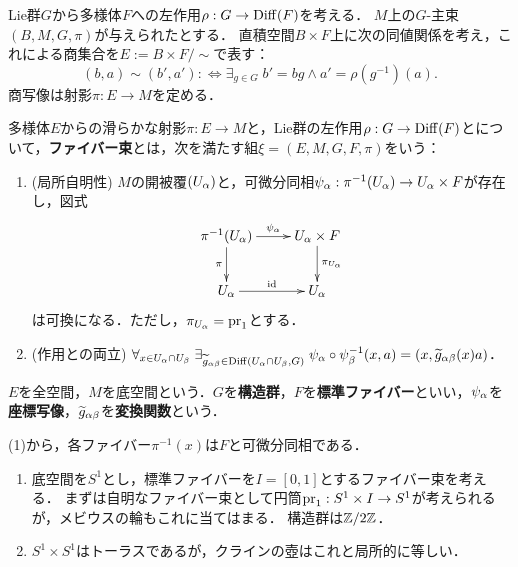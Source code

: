 \documentclass[uplatex,dvipdfmx]{jsreport}
\begin{document}
\begin{discussion}
    Lie群$G$から多様体$F$への左作用$\rho:G\to\mathrm{Diff}(F)$を考える．
    $M$上の$G$-主束$(B,M,G,\pi)$が与えられたとする．
    直積空間$B\times F$上に次の同値関係を考え，これによる商集合を$E:=B\times F/\sim$で表す：
    \[(b,a)\sim(b',a'):\Leftrightarrow\exists_{g\in G}\;b'=bg\land a'=\rho(g^{-1})(a).\]
    商写像は射影$\pi:E\to M$を定める．
\end{discussion}

\begin{definition}
    多様体$E$からの滑らかな射影$\pi:E\to M$と，Lie群の左作用$\rho:G\to\mathrm{Diff}(F)$とについて，\textbf{ファイバー束}とは，次を満たす組$\xi=(E,M,G,F,\pi)$をいう：
    \begin{enumerate}
        \item (局所自明性) $M$の開被覆$(U_\alpha)$と，可微分同相$\psi_\alpha:\pi^{-1}(U_\alpha)\to U_\alpha\times F$が存在し，図式
        \[\xymatrix{
            \pi^{-1}(U_\al)\ar[r]^-{\psi_\al}\ar[d]_-\pi&U_\al\times F\ar[d]^-{\pi_{U_\al}}\\
            U_\al\ar[r]^-{\id}&U_\al
        }\]
        は可換になる．ただし，$\pi_{U_\alpha}=\mathrm{pr}_1$とする．
        \item (作用との両立) $\forall_{x\in U_\alpha\cap U_\beta}\;\exists_{\widetilde{g}_{\alpha\beta}\in\mathrm{Diff}(U_\alpha\cap U_\beta,G)}\;\psi_\alpha\circ\psi_\beta^{-1}(x,a)=(x,\widetilde{g}_{\alpha\beta}(x)a)$．
    \end{enumerate}
    $E$を全空間，$M$を底空間という．$G$を\textbf{構造群}，$F$を\textbf{標準ファイバー}といい，$\psi_\alpha$を\textbf{座標写像}，$\widetilde{g}_{\alpha\beta}$を\textbf{変換関数}という．
\end{definition}
\begin{remarks}
    (1)から，各ファイバー$\pi^{-1}(x)$は$F$と可微分同相である．
\end{remarks}

\begin{example}\mbox{}
    \begin{enumerate}
        \item 底空間を$S^1$とし，標準ファイバーを$I=[0,1]$とするファイバー束を考える．
        まずは自明なファイバー束として円筒$\mathrm{pr}_1:S^1\times I\to S^1$が考えられるが，メビウスの輪もこれに当てはまる．
        構造群は$\mathbb{Z}/2\mathbb{Z}$．
        \item $S^1\times S^1$はトーラスであるが，クラインの壺はこれと局所的に等しい．
    \end{enumerate}
\end{example}
\end{document}
